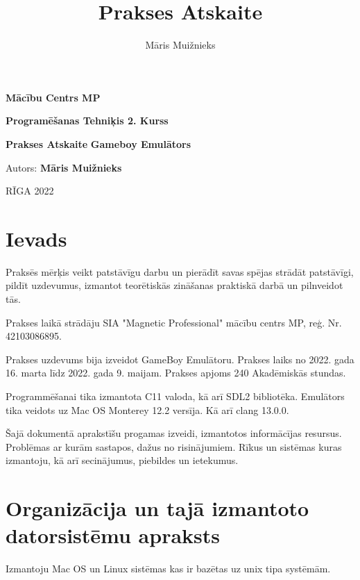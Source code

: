 \documentclass[12pt]{article}
\title{Prakses Atskaite}
\author{Māris Muižnieks}
\begin{document}
	\begin{titlepage}
		\thispagestyle{empty}
		\begin{center}
			\vspace*{2cm}
			\begin{large}\textbf{Mācību Centrs MP}
				
				\textbf{Programēšanas Tehniķis 2. Kurss}
				
				\vfill
				\textbf{Prakses Atskaite}
				\textbf{Gameboy Emulātors}
			\end{large}
			
			\vfill
			
		\end{center}
		\vspace{4cm}
		\begin{flushright}
			Autors: \textbf{Māris Muižnieks}
			
		\end{flushright}
		\vspace{1cm}
		\begin{center}
			RĪGA 2022
		\end{center}
	\end{titlepage}
	\tableofcontents
	\pagebreak
	
	\section{Ievads}
	Praksēs mērķis veikt patstāvīgu darbu un pierādīt savas spējas strādāt patstāvīgi, pildīt uzdevumus, izmantot teorētiskās zināšanas praktiskā darbā un pilnveidot tās.
	
	Prakses laikā strādāju SIA "Magnetic Professional" mācību centrs MP, reģ. Nr. 42103086895. 
	
	Prakses uzdevums bija izveidot GameBoy Emulātoru. Prakses laiks no 2022. gada 16. marta līdz 2022. gada 9. maijam. Prakses apjoms 240 Akadēmiskās stundas. 

	Programmēšanai tika izmantota C11 valoda, kā arī SDL2 bibliotēka. Emulātors tika veidots uz Mac OS Monterey 12.2 versīja. Kā arī clang 13.0.0. 
	
	Šajā dokumentā aprakstīšu progamas izveidi, izmantotos informācījas resursus. Problēmas ar kurām sastapos, dažus no risinājumiem. Rīkus un sistēmas kuras izmantoju, kā arī secinājumus, piebildes un ietekumus.

	\pagebreak
	
	\section{Organizācija un tajā izmantoto datorsistēmu apraksts}
	Izmantoju Mac OS un Linux sistēmas kas ir bazētas uz unix tipa systēmām.
	
\end{document}
